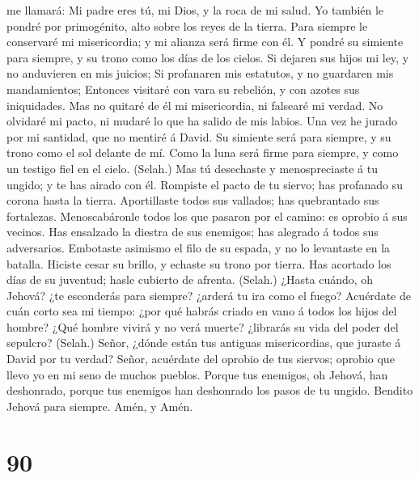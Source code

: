 me llamará: Mi padre eres tú, mi Dios, y la roca de mi salud.
 Yo también le pondré por primogénito, alto sobre los
reyes de la tierra.  Para siempre le conservaré mi
misericordia; y mi alianza será firme con él.  Y pondré
su simiente para siempre, y su trono como los días de los cielos.
 Si dejaren sus hijos mi ley, y no anduvieren en mis
juicios;  Si profanaren mis estatutos, y no guardaren mis
mandamientos;  Entonces visitaré con vara su rebelión, y
con azotes sus iniquidades.  Mas no quitaré de él mi
misericordia, ni falsearé mi verdad.  No olvidaré mi
pacto, ni mudaré lo que ha salido de mis labios.  Una vez
he jurado por mi santidad, que no mentiré á David.  Su
simiente será para siempre, y su trono como el sol delante de mí.
 Como la luna será firme para siempre, y como un testigo
fiel en el cielo. (Selah.)  Mas tú desechaste y
menospreciaste á tu ungido; y te has airado con él. 
Rompiste el pacto de tu siervo; has profanado su corona hasta la tierra.
 Aportillaste todos sus vallados; has quebrantado sus
fortalezas.  Menoscabáronle todos los que pasaron por el
camino: es oprobio á sus vecinos.  Has ensalzado la
diestra de sus enemigos; has alegrado á todos sus adversarios.
 Embotaste asimismo el filo de su espada, y no lo
levantaste en la batalla.  Hiciste cesar su brillo, y
echaste su trono por tierra.  Has acortado los días de su
juventud; hasle cubierto de afrenta. (Selah.)  ¿Hasta
cuándo, oh Jehová? ¿te esconderás para siempre? ¿arderá tu ira como el
fuego?  Acuérdate de cuán corto sea mi tiempo: ¿por qué
habrás criado en vano á todos los hijos del hombre?  ¿Qué
hombre vivirá y no verá muerte? ¿librarás su vida del poder del
sepulcro? (Selah.)  Señor, ¿dónde están tus antiguas
misericordias, que juraste á David por tu verdad?  Señor,
acuérdate del oprobio de tus siervos; oprobio que llevo yo en mi seno de
muchos pueblos.  Porque tus enemigos, oh Jehová, han
deshonrado, porque tus enemigos han deshonrado los pasos de tu ungido.
 Bendito Jehová para siempre. Amén, y Amén.

\hypertarget{section-89}{%
\section{90}\label{section-89}}

